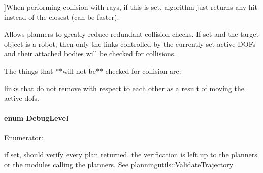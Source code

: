 \begin{Desc}
\begin{description}
{}]When performing collision with rays, if this is set, algorithm just returns any hit instead of the closest (can be faster). \item[{\em 
\hypertarget{namespaceOpenRAVE_a6963e4ecb981351b8fb2e3f9e85acf77a95a75683a1fcadcd3de27e6465d74552}{
CO\_\-ActiveDOFs}
\label{namespaceOpenRAVE_a6963e4ecb981351b8fb2e3f9e85acf77a95a75683a1fcadcd3de27e6465d74552}
}]Allows planners to greatly reduce redundant collision checks. If set and the target object is a robot, then only the links controlled by the currently set active DOFs and their attached bodies will be checked for collisions.

The things that $\ast$$\ast$will not be$\ast$$\ast$ checked for collision are:
\begin{DoxyItemize}
\item links that do not remove with respect to each other as a result of moving the active dofs. 
\end{DoxyItemize}\end{description}
\end{Desc}

\hypertarget{namespaceOpenRAVE_ab658e6d84759440dbf3c890446075395}{
\paragraph[{DebugLevel}]{\setlength{\rightskip}{0pt plus 5cm}enum {\bf DebugLevel}}\hfill}
\label{namespaceOpenRAVE_ab658e6d84759440dbf3c890446075395}
\begin{Desc}
\item[Enumerator: ]\par
\begin{description}
\item[{\em 
\hypertarget{namespaceOpenRAVE_ab658e6d84759440dbf3c890446075395a7ff14d37cfb2aeb879feb53b506cabde}{
Level\_\-VerifyPlans}
\label{namespaceOpenRAVE_ab658e6d84759440dbf3c890446075395a7ff14d37cfb2aeb879feb53b506cabde}
}]if set, should verify every plan returned. the verification is left up to the planners or the modules calling the planners. See planningutils::ValidateTrajectory \end{description}
\end{Desc}

